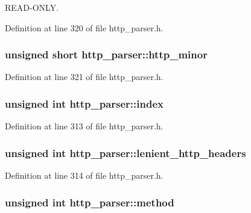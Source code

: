 R\-E\-A\-D-\/\-O\-N\-L\-Y. 



Definition at line 320 of file http\-\_\-parser.\-h.

\hypertarget{structhttp__parser_ae8af6433c824f5348773842db62ad4ab}{
\subsubsection[{http\-\_\-minor}]{\setlength{\rightskip}{0pt plus 5cm}unsigned short http\-\_\-parser\-::http\-\_\-minor}}\label{structhttp__parser_ae8af6433c824f5348773842db62ad4ab}


Definition at line 321 of file http\-\_\-parser.\-h.

\hypertarget{structhttp__parser_a6f7ba706f975f447b3bf72be97facdf8}{
\subsubsection[{index}]{\setlength{\rightskip}{0pt plus 5cm}unsigned int http\-\_\-parser\-::index}}\label{structhttp__parser_a6f7ba706f975f447b3bf72be97facdf8}


Definition at line 313 of file http\-\_\-parser.\-h.

\hypertarget{structhttp__parser_acd80a931fcc87d41999397af1662fc3c}{
\subsubsection[{lenient\-\_\-http\-\_\-headers}]{\setlength{\rightskip}{0pt plus 5cm}unsigned int http\-\_\-parser\-::lenient\-\_\-http\-\_\-headers}}\label{structhttp__parser_acd80a931fcc87d41999397af1662fc3c}


Definition at line 314 of file http\-\_\-parser.\-h.

\hypertarget{structhttp__parser_a7955de339fafd81ad54380845913457d}{
\subsubsection[{method}]{\setlength{\rightskip}{0pt plus 5cm}unsigned int http\-\_\-parser\-::method}}\label{structhttp__parser_a7955de339fafd81ad54380845913457d}


